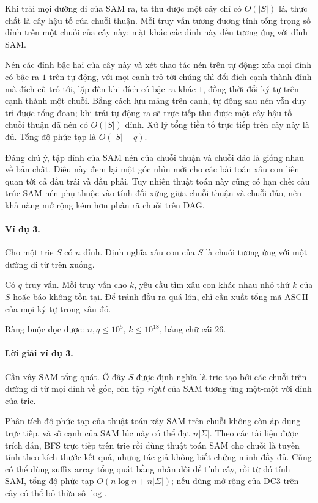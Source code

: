 \documentclass[11pt]{article}
\begin{document}
Khi trải mọi đường đi của SAM ra, ta thu được một cây chỉ có $O(|S|)$ lá, thực
chất là cây hậu tố của chuỗi thuận. Mỗi truy vấn tương đương tính tổng trọng số
đỉnh trên một chuỗi của cây này; mặt khác các đỉnh này đều tương ứng với đỉnh
SAM.

Nén các đỉnh bậc hai của cây này và xét thao tác nén trên tự động: xóa mọi đỉnh
có bậc ra $1$ trên tự động, với mọi cạnh trỏ tới chúng thì đổi đích cạnh thành
đỉnh mà đích cũ trỏ tới, lặp đến khi đích có bậc ra khác $1$, đồng thời đổi ký
tự trên cạnh thành một chuỗi. Bằng cách lưu mảng trên cạnh, tự động sau nén vẫn
duy trì được tổng đoạn; khi trải tự động ra sẽ trực tiếp thu được một cây hậu tố
chuỗi thuận đã nén có $O(|S|)$ đỉnh. Xử lý tổng tiền tố trực tiếp trên cây này
là đủ. Tổng độ phức tạp là $O(|S|+q)$.

Đáng chú ý, tập đỉnh của SAM nén của chuỗi thuận và chuỗi đảo là giống nhau về
bản chất. Điều này đem lại một góc nhìn mới cho các bài toán xâu con liên quan
tới cả đầu trái và đầu phải. Tuy nhiên thuật toán này cũng có hạn chế: cấu trúc
SAM nén phụ thuộc vào tính đối xứng giữa chuỗi thuận và chuỗi đảo, nên khả năng
mở rộng kém hơn phân rã chuỗi trên DAG.

\paragraph{Ví dụ 3.}
Cho một trie $S$ có $n$ đỉnh. Định nghĩa xâu con của $S$ là chuỗi tương ứng với
một đường đi từ trên xuống.

Có $q$ truy vấn. Mỗi truy vấn cho $k$, yêu cầu tìm xâu con khác nhau nhỏ thứ
$k$ của $S$ hoặc báo không tồn tại. Để tránh đầu ra quá lớn, chỉ cần xuất tổng
mã ASCII của mọi ký tự trong xâu đó.

Ràng buộc đọc được: $n,q\le 10^5$, $k\le 10^{18}$, bảng chữ cái $26$.

\paragraph{Lời giải ví dụ 3.}
Cần xây SAM tổng quát. Ở đây $S$ được định nghĩa là trie tạo bởi các chuỗi trên
đường đi từ mọi đỉnh về gốc, còn tập \emph{right} của SAM tương ứng một-một với
đỉnh của trie.

Phân tích độ phức tạp của thuật toán xây SAM trên chuỗi không còn áp dụng trực
tiếp, và số cạnh của SAM lúc này có thể đạt $n|\Sigma|$. Theo các tài liệu được
trích dẫn, BFS trực tiếp trên trie rồi dùng thuật toán SAM cho chuỗi là tuyến
tính theo kích thước kết quả, nhưng tác giả không biết chứng minh đầy đủ. Cũng
có thể dùng suffix array tổng quát bằng nhân đôi để tính cây, rồi từ đó tính
SAM, tổng độ phức tạp $O(n\log n+n|\Sigma|)$; nếu dùng mở rộng của DC3 trên cây
có thể bỏ thừa số $\log$.
\end{document}
